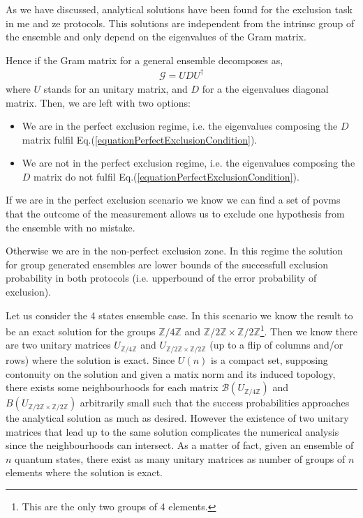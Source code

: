 \documentclass[12pt,letterpaper]{article}
\begin{document}
\begin{multicols}{2}
As we have discussed, analytical solutions have been found for the exclusion task in \gls{me} and \gls{ze} protocols. This solutions are independent from the intrinsc group of the ensemble and only depend on the eigenvalues of the Gram matrix. 

Hence if the Gram matrix for a general ensemble decomposes as,
\begin{align}
	\mathcal{G}= UDU^\dagger
\end{align}
where $U$ stands for an unitary matrix, and $D$ for a the eigenvalues diagonal matrix. Then, we are left with two options:
\begin{itemize}
	\item We are in the perfect exclusion regime, i.e. the eigenvalues composing the $D$ matrix fulfil Eq.(\ref{equationPerfectExclusionCondition}).
	\item We are not in the perfect exclusion regime, i.e. the eigenvalues composing the $D$ matrix do not fulfil Eq.(\ref{equationPerfectExclusionCondition}).
\end{itemize}
If we are in the perfect exclusion scenario we know we can find a set of \gls{povm}s that the outcome of the measurement allows us to exclude one hypothesis from the ensemble with no mistake.

Otherwise we are in the non-perfect exclusion zone. In this regime the solution for group generated ensembles are lower bounds of the successfull exclusion probability in both protocols (i.e. upperbound of the error probability of exclusion).

Let us consider the 4 states ensemble case. In this scenario we know the result to be an exact solution for the groups $\mathbb{Z}/4\mathbb{Z}$ and $\mathbb{Z}/2\mathbb{Z}\times\mathbb{Z}/2\mathbb{Z}$\footnote{This are the only two groups of 4 elements.}. Then we know there are two unitary matrices  $U_{\mathbb{Z}/4\mathbb{Z}}$ and $U_{\mathbb{Z}/2\mathbb{Z}\times\mathbb{Z}/2\mathbb{Z}}$ (up to a flip of columns and/or rows) where the solution is exact. Since $U(n)$ is a compact set, supposing contonuity on the solution and given a matix norm and its induced topology, there exists some neighbourhoods for each matrix $\mathcal{B}(U_{\mathbb{Z}/4\mathbb{Z}})$ and $B(U_{\mathbb{Z}/2\mathbb{Z}\times\mathbb{Z}/2\mathbb{Z}})$ arbitrarily small such that the success probabilities approaches the analytical solution as much as desired. However the existence of two unitary matrices that lead up to the same solution complicates the numerical analysis since the neighbourhoods can intersect. As a matter of fact, given an ensemble of $n$ quantum states, there exist as many unitary matrices as number of groups of $n$ elements where the solution is exact. 


\end{multicols}
\end{document}
